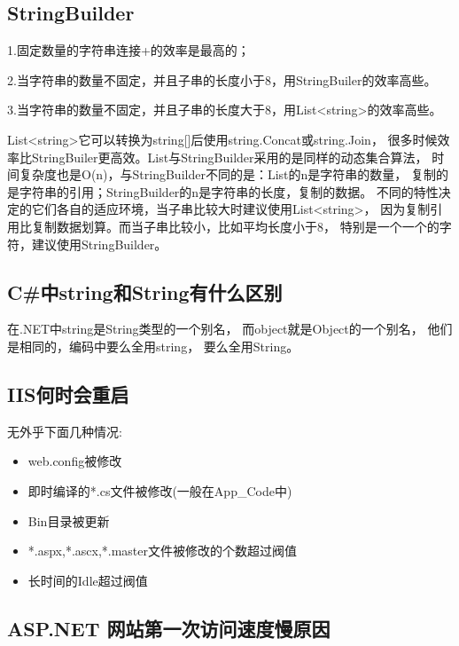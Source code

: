 \documentclass{book}
\begin{document}
\subsection{StringBuilder}

1.固定数量的字符串连接+的效率是最高的；

2.当字符串的数量不固定，并且子串的长度小于8，用StringBuiler的效率高些。

3.当字符串的数量不固定，并且子串的长度大于8，用List<string>的效率高些。
 
List<string>它可以转换为string[]后使用string.Concat或string.Join，
很多时候效率比StringBuiler更高效。List与StringBuilder采用的是同样的动态集合算法，
时间复杂度也是O(n)，与StringBuilder不同的是：List的n是字符串的数量，
复制的是字符串的引用；StringBuilder的n是字符串的长度，复制的数据。
不同的特性决定的它们各自的适应环境，当子串比较大时建议使用List<string>，
因为复制引用比复制数据划算。而当子串比较小，比如平均长度小于8，
特别是一个一个的字符，建议使用StringBuilder。

\subsection{C\#中string和String有什么区别}

在.NET中string是String类型的一个别名，
而object就是Object的一个别名，
他们是相同的，编码中要么全用string，
要么全用String。

\subsection{IIS何时会重启}

无外乎下面几种情况:

\begin{itemize}
\item{web.config被修改}
\item{即时编译的*.cs文件被修改(一般在App\_Code中)}
\item{Bin目录被更新}
\item{*.aspx,*.ascx,*.master文件被修改的个数超过阀值}
\item{长时间的Idle超过阀值}
\end{itemize}

\subsection{ASP.NET 网站第一次访问速度慢原因}
\end{document}
